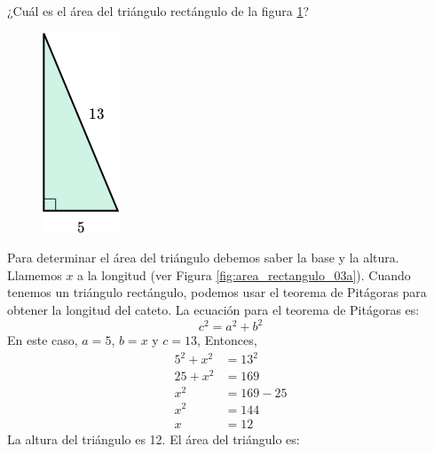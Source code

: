 ¿Cuál es el área del triángulo rectángulo de la figura \ref{fig:area_rectangulo_03}?

\begin{figure}[H]
    \begin{center}
        \includegraphics[width=0.1\linewidth]{../images/area_rectangulo_03.png}
    \end{center}
    \caption{}
    \label{fig:area_rectangulo_03}
\end{figure}
\begin{solutionbox}{15cm}

    \begin{minipage}{0.6\textwidth}
        Para determinar el área del triángulo debemos saber la base y la altura. Llamemos $x$ a la longitud (ver Figura \ref{fig:area_rectangulo_03a}).
        Cuando tenemos un triángulo rectángulo, podemos usar el teorema de Pitágoras para obtener la longitud del cateto.
        La ecuación para el teorema de Pitágoras es:
        \[c^2=a^2+b^2\]
        En este caso, $a=5$, $b=x$ y $c=13$, Entonces,
        \begin{align*}
            5^2+x^2 & =13^2   \\
            25+x^2  & =169    \\
            x^2     & =169-25 \\
            x^2     & =144    \\
            x       & =12
        \end{align*}
        La altura del triángulo es 12. El área del triángulo es:


\end{minipage}
\end{solutionbox}
